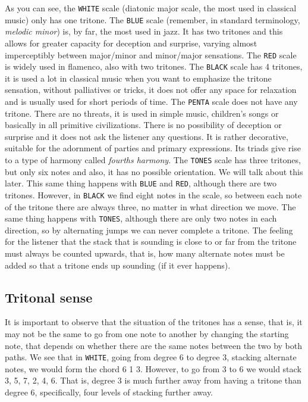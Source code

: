 \documentclass[]{report}
\begin{document}
As you can see, the \texttt{WHITE} scale (diatonic major scale, the most used in classical music) only has one tritone.
The \texttt{BLUE} scale (remember, in standard terminology, \emph{melodic minor}) is, by far, the most used in jazz. It has two tritones and this allows for greater capacity for deception and surprise, varying almost imperceptibly between major/minor and minor/major sensations.
The \texttt{RED} scale is widely used in flamenco, also with two tritones.
The \texttt{BLACK} scale has 4 tritones, it is used a lot in classical music when you want to emphasize the tritone sensation, without palliatives or tricks, it does not offer any space for relaxation and is usually used for short periods of time.
The \texttt{PENTA} scale does not have any tritone. There are no threats, it is used in simple music, children's songs or basically in all primitive civilizations. There is no possibility of deception or surprise and it does not ask the listener any questions. It is rather decorative, suitable for the adornment of parties and primary expressions. Its triads give rise to a type of harmony called \emph{fourths harmony}.
The \texttt{TONES} scale has three tritones, but only six notes and also, it has no possible orientation. We will talk about this later.
This same thing happens with \texttt{BLUE} and \texttt{RED}, although there are two tritones.
However, in \texttt{BLACK} we find eight notes in the scale, so between each note of the tritone there are always three, no matter in what direction we move.
The same thing happens with \texttt{TONES}, although there are only two notes in each direction, so by alternating jumps we can never complete a tritone.
The feeling for the listener that the stack that is sounding is close to or far from the tritone must always be counted upwards, that is, how many alternate notes must be added so that a tritone ends up sounding (if it ever happens).
\subsection{Tritonal sense}
It is important to observe that the situation of the tritones has a sense, that is, it may not be the same to go from one note to another by changing the starting note, that depends on whether there are the same notes between the two by both paths. We see that in \texttt{WHITE}, going from degree 6 to degree 3, stacking alternate notes, we would form the chord 6 1 3. However, to go from 3 to 6 we would stack 3, 5, 7, 2, 4, 6. That is, degree 3 is much further away from having a tritone than degree 6, specifically, four levels of stacking further away.
\end{document}
